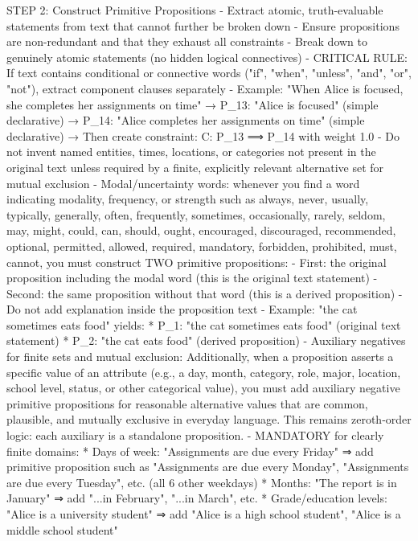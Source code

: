 STEP 2: Construct Primitive Propositions
- Extract atomic, truth-evaluable statements from text that cannot further be broken down
- Ensure propositions are non-redundant and that they exhaust all constraints
- Break down to genuinely atomic statements (no hidden logical connectives)
- CRITICAL RULE: If text contains conditional or connective words ("if", "when", "unless", "and", "or", "not"), extract component clauses separately
  - Example: "When Alice is focused, she completes her assignments on time"
    → P_13: "Alice is focused" (simple declarative)
    → P_14: "Alice completes her assignments on time" (simple declarative)
    → Then create constraint: C: P_13 ⟹ P_14 with weight 1.0
- Do not invent named entities, times, locations, or categories not present in the original text unless required by a finite, explicitly relevant alternative set for mutual exclusion
- Modal/uncertainty words: whenever you find a word indicating modality, frequency, or strength such as
  always, never, usually, typically, generally, often, frequently, sometimes, occasionally, rarely, seldom,
  may, might, could, can, should, ought, encouraged, discouraged, recommended, optional, permitted, allowed,
  required, mandatory, forbidden, prohibited, must, cannot,
  you must construct TWO primitive propositions:
  - First: the original proposition including the modal word (this is the original text statement)
  - Second: the same proposition without that word (this is a derived proposition)
  - Do not add explanation inside the proposition text
  - Example: "the cat sometimes eats food" yields:
    * P_1: "the cat sometimes eats food" (original text statement)
    * P_2: "the cat eats food" (derived proposition)
- Auxiliary negatives for finite sets and mutual exclusion:
  Additionally, when a proposition asserts a specific value of an attribute (e.g., a day, month, category, role,
  major, location, school level, status, or other categorical value), you must add auxiliary negative primitive
  propositions for reasonable alternative values that are common, plausible, and mutually exclusive in everyday
  language. This remains zeroth‑order logic: each auxiliary is a standalone proposition.
  - MANDATORY for clearly finite domains:
    * Days of week: "Assignments are due every Friday" ⇒ add primitive proposition such as "Assignments are due every Monday", "Assignments are due every Tuesday", etc. (all 6 other weekdays)
    * Months: "The report is in January" ⇒ add "...in February", "...in March", etc.
    * Grade/education levels: "Alice is a university student" ⇒ add "Alice is a high school student", "Alice is a middle school student"
